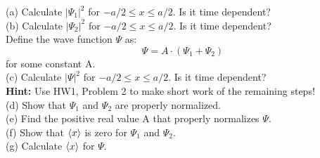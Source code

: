 \documentclass[12pt]{article}
\begin{document}
\noindent
(a) Calculate $|\Psi_1|^2$ for $-a/2 \leq x \leq a/2$.  Is it time dependent?\\[5pt]
(b) Calculate $|\Psi_2|^2$ for $-a/2 \leq x \leq a/2$.  Is it time dependent?\\[5pt]
Define the wave function $\Psi$ as:
\begin{displaymath}
\Psi = A \cdot \left( \Psi_1 + \Psi_2 \right)
\end{displaymath}
for some constant A.\\[5pt]
(c) Calculate $|\Psi|^2$ for $-a/2 \leq x \leq a/2$.  Is it time dependent?\\[5pt]
{\bf Hint:} Use HW1, Problem 2 to make short work of the remaining steps!\\[5pt]
(d) Show that $\Psi_1$ and $\Psi_2$ are properly normalized.\\[5pt]
(e) Find the positive real value A that properly normalizes $\Psi$.\\[5pt]
(f) Show that $\braket{x}$ is zero for $\Psi_1$ and $\Psi_2$.\\[5pt]
(g) Calculate $\braket{x}$ for $\Psi$.\\
\end{document}
